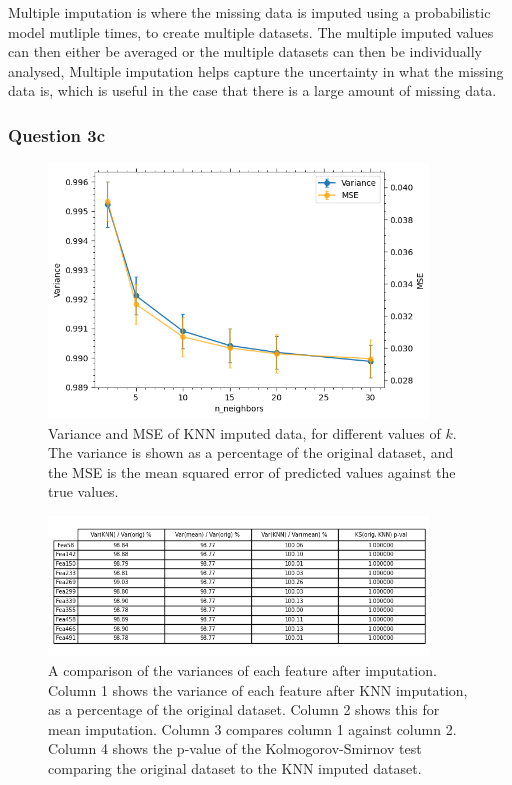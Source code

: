     Multiple imputation is where the missing data is imputed using a probabilistic model mutliple times, to create
    multiple datasets.
    The multiple imputed values can then either be averaged or the multiple datasets can then be individually analysed,
    Multiple imputation helps capture the uncertainty in what the missing data is, which is useful in the case that
    there is a large amount of missing data.

\subsubsection{Question 3c}\label{subsubsec:q3c}
    \begin{figure}[htb]
    \centering
    \includegraphics[width=0.9\textwidth]{./figures/q3c_optimise_knn_imputer}
    \caption{Variance and MSE of KNN imputed data, for different values of $k$. The variance is shown as a percentage
        of the original dataset, and the MSE is the mean squared error of predicted values against the true values.}
    \label{fig:q3c_optimise_knn_imputer}
    \end{figure}

    \begin{figure}[htb]
    \centering
    \includegraphics[width=0.9\textwidth]{./figures/q3c_2}
    \caption{A comparison of the variances of each feature after imputation. Column 1 shows the variance of each feature
        after KNN imputation, as a percentage of the original dataset. Column 2 shows this for mean imputation.
        Column 3 compares column 1 against column 2. Column 4 shows the p-value of the Kolmogorov-Smirnov test comparing
        the original dataset to the KNN imputed dataset.}
    \label{fig:q3c_2}
    \end{figure}

